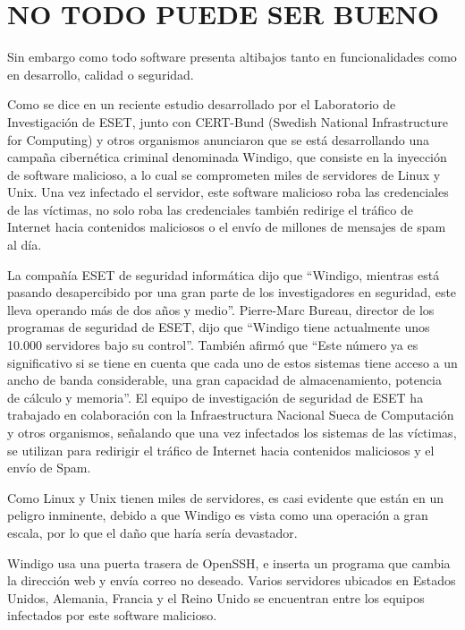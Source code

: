 \section*{NO TODO PUEDE SER BUENO}
Sin embargo como todo software presenta altibajos tanto en funcionalidades como en desarrollo, calidad o seguridad.
                                           
Como se dice en un reciente estudio desarrollado por el Laboratorio de Investigación de ESET, junto con CERT-Bund (Swedish National Infrastructure for   Computing) y otros 
organismos anunciaron que se está desarrollando una campaña cibernética criminal denominada Windigo, que consiste en  la inyección de software malicioso, a lo cual se comprometen 
miles de servidores de Linux y Unix. Una vez infectado el servidor, este software malicioso roba las credenciales de las víctimas, no  solo roba las credenciales también redirige  
el tráfico de Internet hacia contenidos maliciosos o el envío de millones de mensajes de spam al día.

La compañía ESET de seguridad informática dijo que “Windigo, mientras está   pasando desapercibido por una gran  parte de los investigadores en seguridad, este lleva operando más 
de dos años y medio”. Pierre-Marc Bureau, director de los programas de seguridad de ESET, dijo que “Windigo tiene actualmente unos 10.000 servidores bajo su control”. También 
afirmó que “Este número ya es significativo si se tiene en cuenta que cada uno de estos sistemas tiene acceso a un ancho de banda considerable, una gran capacidad de 
almacenamiento, potencia de cálculo y memoria”. El equipo de investigación de seguridad de ESET ha trabajado en colaboración con la Infraestructura Nacional Sueca de Computación 
y otros organismos, señalando que una vez infectados los sistemas de las víctimas, se utilizan para redirigir el tráfico de Internet  hacia contenidos maliciosos y el envío de 
Spam.

Como Linux  y Unix  tienen miles de servidores, es casi evidente que están en un peligro inminente, debido a que Windigo es vista como una operación a gran escala, por lo que el 
daño que haría sería devastador.

Windigo usa una puerta trasera de OpenSSH, e inserta un programa que cambia la dirección web y envía correo no deseado. Varios servidores ubicados en Estados Unidos, Alemania, 
Francia y el Reino Unido se encuentran entre los equipos infectados por este  software  malicioso.


